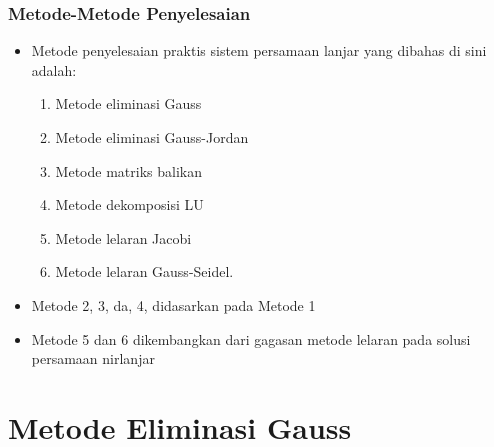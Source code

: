\documentclass[pdflatex,compress,mathserif]{beamer}
\begin{document}
\begin{frame}
	\frametitle{Metode-Metode Penyelesaian}
	\begin{itemize}
		\item Metode penyelesaian praktis sistem persamaan lanjar yang dibahas di sini adalah:
		\begin{enumerate}
			\item Metode eliminasi Gauss 
			\item Metode eliminasi Gauss-Jordan
			\item Metode matriks balikan
			\item Metode dekomposisi LU
			\item Metode lelaran Jacobi
			\item Metode lelaran Gauss-Seidel.
		\end{enumerate}
		\item Metode 2, 3, da, 4, didasarkan pada Metode 1
		\item Metode 5 dan 6 dikembangkan dari gagasan metode lelaran pada solusi persamaan nirlanjar
	\end{itemize}
\end{frame}

\section{Metode Eliminasi Gauss}
\end{document}
